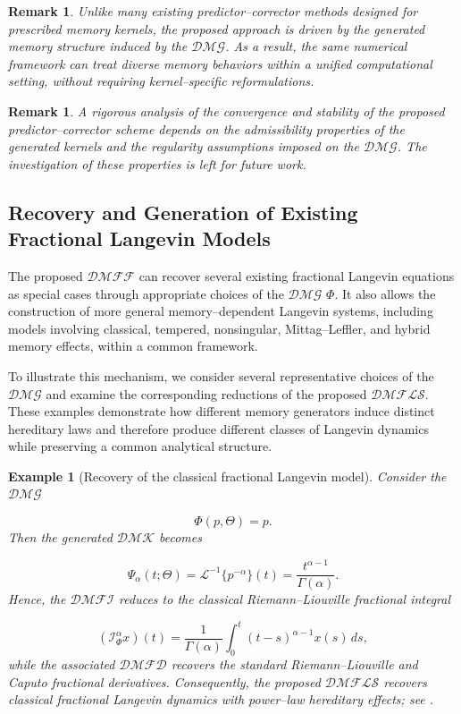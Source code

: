 \documentclass[11pt]{article}
\numberwithin{equation}{section}
\newtheorem{remark}[definition]{Remark}
\newtheorem{example}[definition]{Example}
\begin{document}
\begin{remark}
Unlike many existing predictor--corrector methods designed for prescribed memory
kernels, the proposed approach is driven by the generated memory structure induced
by the $\mathcal{DMG}$. As a result, the same numerical framework can treat diverse
memory behaviors within a unified computational setting, without requiring
kernel--specific reformulations.
\end{remark}
\begin{remark}
A rigorous analysis of the convergence and stability of the proposed predictor--corrector scheme depends on the admissibility properties of the generated kernels and the regularity assumptions imposed on the $\mathcal{DMG}$. The investigation of these properties is left for future work.
\end{remark}

\subsection{Recovery and Generation of Existing Fractional Langevin Models}
The proposed $\mathcal{DMFF}$ can recover several existing fractional Langevin equations as special cases through appropriate choices of the $\mathcal{DMG}$ $\Phi$. It also allows the construction of more general memory--dependent Langevin systems, including models involving classical, tempered, nonsingular, Mittag--Leffler, and hybrid memory effects, within a common framework.

To illustrate this mechanism, we consider several representative choices of the $\mathcal{DMG}$ and examine the corresponding reductions of the proposed  $\mathcal{DMFLS}$. These examples demonstrate how different memory generators induce distinct hereditary laws and therefore produce different classes of Langevin dynamics while preserving a common analytical structure.


\begin{example}[Recovery of the classical fractional Langevin model]

Consider the $\mathcal{DMG}$

\[
\Phi(p,\Theta)=p.
\]
Then the generated $\mathcal{DMK}$ becomes

\[
\Psi_\alpha(t;\Theta)
=
\mathcal L^{-1}
\{
p^{-\alpha}
\}(t)
=
\frac{t^{\alpha-1}}
{\Gamma(\alpha)}.
\]
Hence, the $\mathcal{DMFI}$ reduces to the classical
Riemann--Liouville fractional integral

\[
(\mathcal I_\Phi^\alpha x)(t)
=
\frac1{\Gamma(\alpha)}
\int_0^t
(t-s)^{\alpha-1}
x(s)\,ds,
\]
while the associated $\mathcal{DMFD}$ recovers the standard
Riemann--Liouville and Caputo fractional derivatives.
Consequently, the proposed $\mathcal{DMFLS}$ recovers classical fractional Langevin dynamics with power--law hereditary effects; see \cite{Kou2008}.

\end{example}
\end{document}
